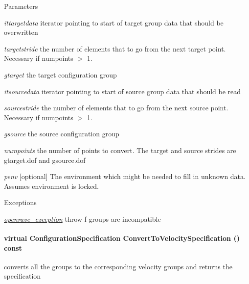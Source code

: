 \begin{DoxyParams}{Parameters}
\item[{\em ittargetdata}]iterator pointing to start of target group data that should be overwritten \item[{\em targetstride}]the number of elements that to go from the next target point. Necessary if numpoints $>$ 1. \item[{\em gtarget}]the target configuration group \item[{\em itsourcedata}]iterator pointing to start of source group data that should be read \item[{\em sourcestride}]the number of elements that to go from the next source point. Necessary if numpoints $>$ 1. \item[{\em gsource}]the source configuration group \item[{\em numpoints}]the number of points to convert. The target and source strides are gtarget.dof and gsource.dof \item[{\em penv}]\mbox{[}optional\mbox{]} The environment which might be needed to fill in unknown data. Assumes environment is locked. \end{DoxyParams}

\begin{DoxyExceptions}{Exceptions}
\item[{\em \hyperlink{classOpenRAVE_1_1openrave__exception}{openrave\_\-exception}}]throw f groups are incompatible \end{DoxyExceptions}
\hypertarget{classOpenRAVE_1_1ConfigurationSpecification_a1f02e17eb90a72326f6a479c7747c9c8}{
\paragraph[{ConvertToVelocitySpecification}]{\setlength{\rightskip}{0pt plus 5cm}virtual {\bf ConfigurationSpecification} ConvertToVelocitySpecification () const}\hfill}
\label{classOpenRAVE_1_1ConfigurationSpecification_a1f02e17eb90a72326f6a479c7747c9c8}


converts all the groups to the corresponding velocity groups and returns the specification 

